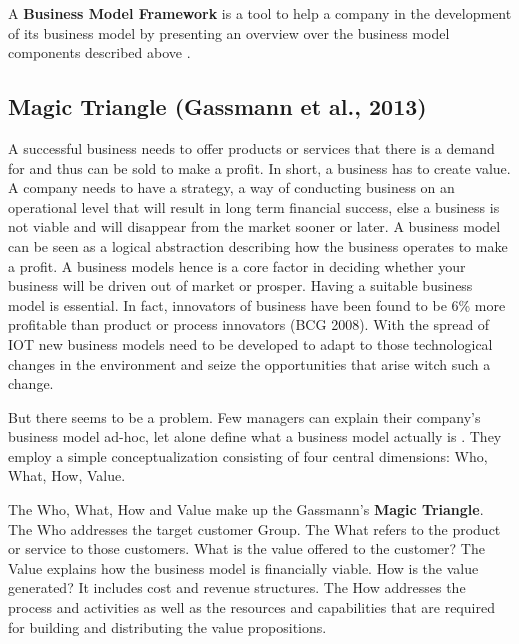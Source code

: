 		 A \textbf{Business Model Framework} is a tool to help a company in the development of its business model by presenting an overview over the business model components described above \cite{dijkman}.

	\subsection{Magic Triangle (Gassmann et al., 2013)}
		A successful business needs to offer products or services that there is a demand for and thus can be sold to make a profit. In short, a business has to create value. A company needs to have a strategy, a way of conducting business on an operational level that will result in long term financial success, else a business is not viable and will disappear from the market sooner or later.
		A business model can be seen as a logical abstraction describing how the business operates to make a profit. A business models hence is a core factor in deciding whether your business will be driven out of market or prosper. Having a suitable business model is essential. In fact, innovators of business have been found to be 6\% more profitable than product or process innovators (BCG 2008). With the spread of IOT new business models need to be developed to adapt to those technological changes in the environment and seize the opportunities that arise witch such a change. 

		But there seems to be a problem. Few managers can explain their company's business model ad-hoc, let alone define what a business model actually is \cite{gassmann}. They employ a simple conceptualization consisting of four central dimensions: Who, What, How, Value. 

		The Who, What, How and Value make up the Gassmann's \textbf{Magic Triangle}. The Who addresses the target customer Group. The What refers to the product or service to those customers. What is the value offered to the customer? The Value explains how the business model is financially viable. How is the value generated? It includes cost and revenue structures. The How addresses the process and activities as well as the resources and capabilities that are required for building and distributing the value propositions.		
					
